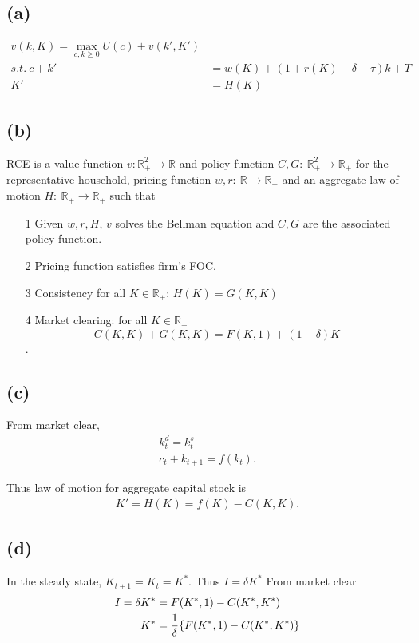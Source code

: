 \documentclass{ltjsarticle}
\begin{document}
\section{} %
\subsection*{(a)}
\begin{align*}
    v(k,K)= \max_{c,k\geq 0} U(c) + v(k', K')\\
    s.t.\ c+k' &= w(K) + (1+r(K)-\delta -\tau)k + T\\
    K' &= H(K)
\end{align*}

\subsection*{(b)}
RCE is a value function $v:\mathbb{R}^2_{+}\rightarrow \mathbb{R}$ and policy function $C,G:\ \mathbb{R}^2_{+}\rightarrow \mathbb{R}_{+}$ for the representative household, pricing function $w,r:\ \mathbb{R}\rightarrow \mathbb{R}_{+}$ and an aggregate law of motion $H:\ \mathbb{R}_{+}\rightarrow \mathbb{R}_{+}$ such that
\begin{itemize}
    \item[1] Given $w,r,H$, $v$ solves the Bellman equation and $C,G$ are the associated policy function.
    \item[2] Pricing function satisfies firm's FOC.
    \item[3] Consistency for all $K\in \mathbb{R}_{+}$: $H(K) = G(K,K)$
    \item[4] Market clearing: for all $K\in \mathbb{R}_{+}$
    $$C(K,K)+G(K,K) = F(K,1) + (1-\delta)K$$.
\end{itemize}

\subsection*{(c)}
From market clear,
\begin{gather*}
    k_t^d = k_t^s\\
    c_t+k_{t+1}=f(k_t).
\end{gather*}

Thus law of motion for aggregate capital stock is 
\begin{align*}
    K' = H(K)=f(K)-C(K,K).
\end{align*}

\subsection*{(d)}
In the steady state, $K_{t+1}=K_t = K^{*}$. Thus $I=\delta K^{*}$
From market clear
\begin{align*}
    I=\delta K^{*} &= F(K^{*},1) - C(K^{*},K^{*})\\
    K^{*} &=\frac{1}{\delta} \qty{F(K^{*},1) - C(K^{*},K^{*})}
\end{align*}
\end{document}
